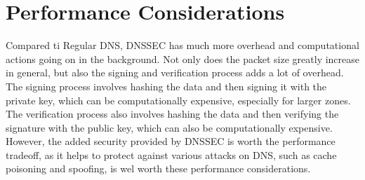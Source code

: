 \section{Performance Considerations}

Compared ti Regular DNS, DNSSEC has much more overhead and computational actions going on in the background. Not only does the packet size greatly increase in general, but also the signing 
and verification process adds a lot of overhead. The signing process involves hashing the data and then signing it with the private key, which can be computationally expensive, especially for 
larger zones. The verification process also involves hashing the data and then verifying the signature with the public key, which can also be computationally expensive. However, the added 
security provided by DNSSEC is worth the performance tradeoff, as it helps to protect against various attacks on DNS, such as cache poisoning and spoofing, is wel worth these performance considerations.\cite{bind-9}